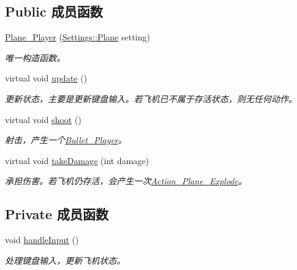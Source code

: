 \subsection*{Public 成员函数}
\begin{DoxyCompactItemize}
\item 
\hyperlink{class_plane___player_ae07c92eb62cd45f7fd5d12fb570934e2}{Plane\+\_\+\+Player} (\hyperlink{struct_settings_1_1_plane}{Settings\+::\+Plane} setting)
\begin{DoxyCompactList}\small\item\em 唯一构造函数。 \end{DoxyCompactList}\item 
\mbox{\label{class_plane___player_ae68c08ce11fad9fd164c00eb4db6b348}} 
virtual void \hyperlink{class_plane___player_ae68c08ce11fad9fd164c00eb4db6b348}{update} ()
\begin{DoxyCompactList}\small\item\em 更新状态，主要是更新键盘输入。若飞机已不属于存活状态，则无任何动作。 \end{DoxyCompactList}\item 
\mbox{\label{class_plane___player_a3ffa86506370f74ec859e74d42c568c2}} 
virtual void \hyperlink{class_plane___player_a3ffa86506370f74ec859e74d42c568c2}{shoot} ()
\begin{DoxyCompactList}\small\item\em 射击，产生一个\hyperlink{class_bullet___player}{Bullet\+\_\+\+Player}。 \end{DoxyCompactList}\item 
\mbox{\label{class_plane___player_a40e7f20858e2738e5a72b15eb1c28421}} 
virtual void \hyperlink{class_plane___player_a40e7f20858e2738e5a72b15eb1c28421}{take\+Damage} (int damage)
\begin{DoxyCompactList}\small\item\em 承担伤害。若飞机仍存活，会产生一次\hyperlink{class_action___plane___explode}{Action\+\_\+\+Plane\+\_\+\+Explode}。 \end{DoxyCompactList}\end{DoxyCompactItemize}
\subsection*{Private 成员函数}
\begin{DoxyCompactItemize}
\item 
\mbox{\label{class_plane___player_a7a356939196bfe1447fbd5fc03b8c380}} 
void \hyperlink{class_plane___player_a7a356939196bfe1447fbd5fc03b8c380}{handle\+Input} ()
\begin{DoxyCompactList}\small\item\em 处理键盘输入，更新飞机状态。 \end{DoxyCompactList}\end{DoxyCompactItemize}
